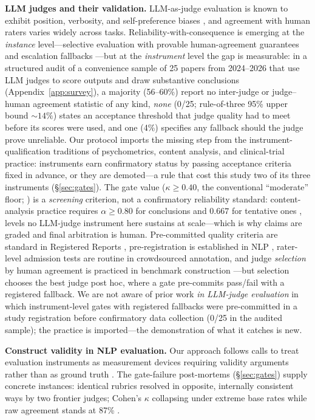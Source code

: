 \documentclass{article}
\newcommand{\kap}{\kappa}
\begin{document}
\textbf{LLM judges and their validation.} LLM-as-judge evaluation is known
to exhibit position, verbosity, and self-preference biases
\citep{zheng2023judging,ye2024justice,panickssery2024selfpreference}, and agreement with human raters varies widely
across tasks. Reliability-with-consequence is emerging at the
\emph{instance} level---selective evaluation with provable human-agreement
guarantees and escalation fallbacks \citep{jung2025trust}---but at the
\emph{instrument} level the gap is measurable: in a structured audit of
a convenience sample of 25 papers from 2024--2026 that use LLM judges to
score outputs and draw substantive conclusions
(Appendix~\ref{app:survey}), a majority (56--60\%) report no
inter-judge or judge--human agreement statistic of any kind, \emph{none}
(0/25; rule-of-three 95\% upper bound ${\sim}14\%$) states an
acceptance threshold that judge quality had to meet
before its scores were used, and one (4\%) specifies any fallback should
the judge prove unreliable. Our protocol imports the missing step from
the instrument-qualification traditions of psychometrics, content
analysis, and clinical-trial practice: instruments earn confirmatory
status by passing acceptance criteria fixed in advance, or they are
demoted---a rule that cost this study two of its three instruments
(\S\ref{sec:gates}). The gate value ($\kap \ge 0.40$, the conventional
``moderate'' floor; \citealp{landis1977measurement}) is a
\emph{screening} criterion, not a confirmatory reliability standard:
content-analysis practice requires $\alpha \ge 0.80$ for conclusions
and $0.667$ for tentative ones \citep{krippendorff2004content}, levels
no LLM-judge instrument here sustains at scale---which is why claims are
graded and final arbitration is human. Pre-committed quality criteria
are standard in Registered Reports \citep{chambers2022registered},
pre-registration is established in NLP
\citep{vanmiltenburg2021preregistering}, rater-level admission tests
are routine in crowdsourced annotation, and judge \emph{selection} by
human agreement is practiced in benchmark construction
\citep{dubois2024length,lambert2024tulu}---but selection chooses the
best judge post hoc, where a gate pre-commits pass/fail with a
registered fallback. We are not aware of prior work \emph{in LLM-judge
evaluation} in which instrument-level gates with registered fallbacks
were pre-committed in a study registration before confirmatory data
collection (0/25 in the audited sample); the practice is imported---the
demonstration of what it catches is new.

\textbf{Construct validity in NLP evaluation.} Our approach follows calls
to treat evaluation instruments as measurement devices requiring validity
arguments rather than as ground truth
\citep{jacobs2021measurement,flake2020measurement}. The
gate-failure post-mortems (\S\ref{sec:gates}) supply concrete instances:
identical rubrics resolved in opposite, internally consistent ways by two
frontier judges; Cohen's $\kap$ collapsing under extreme base rates while
raw agreement stands at 87\% \citep{gwet2008computing}.
\end{document}

